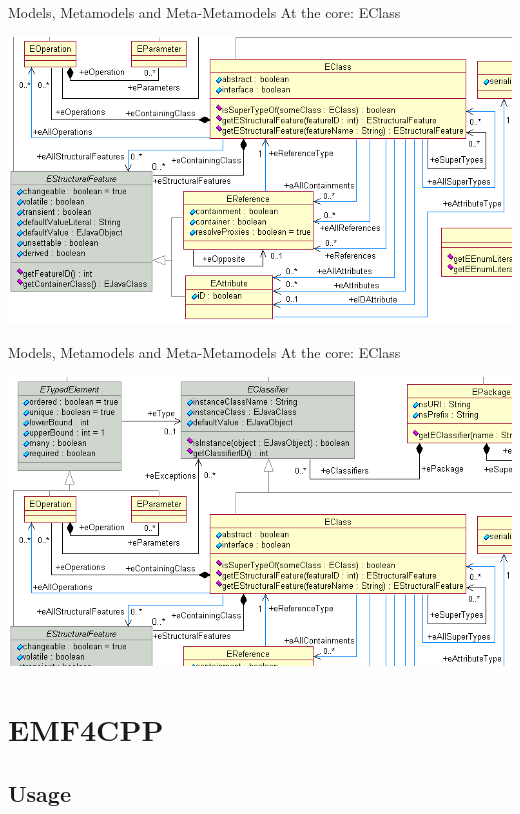 \documentclass[pdf, 10pt]{beamer}
\begin{document}
\begin{frame}{Models, Metamodels and Meta-Metamodels}
At the core: EClass
\begin{center}
\includegraphics[width=\linewidth,height=0.8\textheight,keepaspectratio]{EMF/EcoreRelations-EClass.png}
\end{center}
\end{frame}

\begin{frame}{Models, Metamodels and Meta-Metamodels}
At the core: EClass
\begin{center}
\includegraphics[width=\linewidth,height=0.8\textheight,keepaspectratio]{EMF/EcoreRelations-ETypedElement.png}
\end{center}
\end{frame}


\section{EMF4CPP}

\subsection{Usage}
\end{document}
